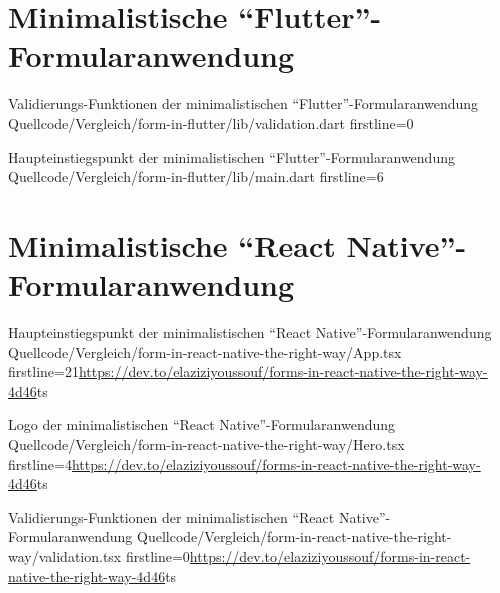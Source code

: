

\chapter{Minimalistische \enquote{Flutter}-For\-mu\-lar\-an\-wen\-dung}
\label{chap:VergleichFlutter}

\begin{alexlisting}{}{Validierungs-Funktionen der minimalistischen \enquote{Flutter}-For\-mu\-lar\-an\-wen\-dung}
  {Quellcode/Vergleich/form-in-flutter/lib/validation.dart}
  {firstline=0}
  \label{lst:VergleichFlutterValidation}
\end{alexlisting}

\renewcommand{\fcolorbox}[4][]{#4}
\begin{alexlisting}{}{Haupteinstiegspunkt der minimalistischen \enquote{Flutter}-For\-mu\-lar\-an\-wen\-dung}
  {Quellcode/Vergleich/form-in-flutter/lib/main.dart}
  {firstline=6}
  \label{lst:VergleichFlutterMain}
\end{alexlisting}

\clearpage
\chapter{Minimalistische \enquote{React Native}-For\-mu\-lar\-an\-wen\-dung} 
\label{chap:VergleichReactNatveApp}

\begin{fremdeslisting}{}{Haupteinstiegspunkt der minimalistischen \enquote{React Native}-For\-mu\-lar\-an\-wen\-dung}
  {Quellcode/Vergleich/form-in-react-native-the-right-way/App.tsx}
  {firstline=21}{\url{https://dev.to/elaziziyoussouf/forms-in-react-native-the-right-way-4d46}}{ts}

  \label{lst:VergleichReactNatveApp}

\end{fremdeslisting}

\begin{fremdeslisting}{}{Logo der minimalistischen \enquote{React Native}-For\-mu\-lar\-an\-wen\-dung}
  {Quellcode/Vergleich/form-in-react-native-the-right-way/Hero.tsx}
  {firstline=4}{\url{https://dev.to/elaziziyoussouf/forms-in-react-native-the-right-way-4d46}}{ts}

  \label{lst:VergleichReactNatveHero}

\end{fremdeslisting}

\begin{fremdeslisting}{}{Validierungs-Funktionen der minimalistischen \enquote{React Native}-For\-mu\-lar\-an\-wen\-dung}
  {Quellcode/Vergleich/form-in-react-native-the-right-way/validation.tsx}
  {firstline=0}{\url{https://dev.to/elaziziyoussouf/forms-in-react-native-the-right-way-4d46}}{ts}

  \label{lst:VergleichReactNatveValidation}

\end{fremdeslisting}
 
